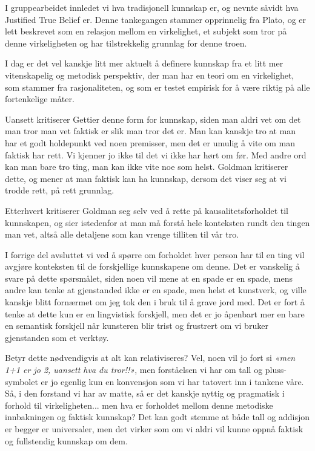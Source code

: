 \documentclass{myassignment}
\begin{document}
	I gruppearbeidet innledet vi hva tradisjonell kunnskap er, og nevnte såvidt hva Justified True Belief er. Denne tankegangen stammer opprinnelig fra Plato, og er lett beskrevet som en relasjon mellom en virkelighet, et subjekt som tror på denne virkeligheten og har tilstrekkelig grunnlag for denne troen.

	I dag er det vel kanskje litt mer aktuelt å definere kunnskap fra et litt mer vitenskapelig og metodisk perspektiv, der man har en teori om en virkelighet, som stammer fra rasjonaliteten, og som er testet empirisk for å være riktig på alle fortenkelige måter.

	Uansett kritiserer Gettier denne form for kunnskap, siden man aldri vet om det man tror man vet faktisk er slik man tror det er. Man kan kanskje tro at man har et godt holdepunkt ved noen premisser, men det er umulig å vite om man faktisk har rett. Vi kjenner jo ikke til det vi ikke har hørt om før. Med andre ord kan man bare tro ting, man kan ikke vite noe som helst. Goldman kritiserer dette, og mener at man faktisk kan ha kunnskap, dersom det viser seg at vi trodde rett, på rett grunnlag.

	Etterhvert kritiserer Goldman seg selv ved å rette på kausalitetsforholdet til kunnskapen, og sier istedenfor at man må forstå hele konteksten rundt den tingen man vet, altså alle detaljene som kan vrenge tilliten til vår tro.

	I forrige del avsluttet vi ved å spørre om forholdet hver person har til en ting vil avgjøre konteksten til de forskjellige kunnskapene om denne. Det er vanskelig å svare på dette spørsmålet, siden noen vil mene at en spade er en spade, mens andre kan tenke at gjenstanded ikke er en spade, men helst et kunstverk, og ville kanskje blitt fornærmet om jeg tok den i bruk til å grave jord med. Det er fort å tenke at dette kun er en lingvistisk forskjell, men det er jo åpenbart mer en bare en semantisk forskjell når kunsteren blir trist og frustrert om vi bruker gjenstanden som et verktøy.

	Betyr dette nødvendigvis at alt kan relativiseres? Vel, noen vil jo fort si \textit{«men 1+1 er jo 2, uansett hva du tror!!»}, men forståelsen vi har om tall og pluss-symbolet er jo egenlig kun en konvensjon som vi har tatovert inn i tankene våre. Så, i den forstand vi har av matte, så er det kanskje nyttig og pragmatisk i forhold til virkeligheten... men hva er forholdet mellom denne metodiske innbakningen og faktisk kunnskap? Det kan godt stemme at både tall og addisjon er begger er universaler, men det virker som om vi aldri vil kunne oppnå faktisk og fullstendig kunnskap om dem.
\end{document}
